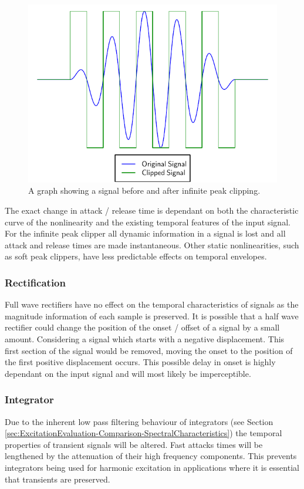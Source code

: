 			\begin{figure}[h!]
				\centering
				\includegraphics{chapter5/Images/InfinitePeakClipping.pdf}
				\caption{A graph showing a signal before and after infinite peak clipping.}
				\label{fig:InfinitePeakClipping}
			\end{figure}

			The exact change in attack / release time is dependant on both the characteristic curve of the
			nonlinearity and the existing temporal features of the input signal. For the infinite peak clipper
			all dynamic information in a signal is lost and all attack and release times are made
			instantaneous.  Other static nonlinearities, such as soft peak clippers, have less predictable
			effects on temporal envelopes. 

		\subsubsection*{Rectification}
			Full wave rectifiers have no effect on the temporal characteristics of signals as the magnitude
			information of each sample is preserved. It is possible that a half wave rectifier could change the
			position of the onset / offset of a signal by a small amount. Considering a signal which starts
			with a negative displacement. This first section of the signal would be removed, moving the onset
			to the position of the first positive displacement occurs. This possible delay in onset is highly
			dependant on the input signal and will most likely be imperceptible.
			
		\subsubsection*{Integrator}
			Due to the inherent low pass filtering behaviour of integrators (see Section
			\ref{sec:ExcitationEvaluation-Comparison-SpectralCharacteristics}) the temporal properties of
			transient signals will be altered. Fast attacks times will be lengthened by the attenuation of
			their high frequency components. This prevents integrators being used for harmonic excitation in
			applications where it is essential that transients are preserved. 
			
